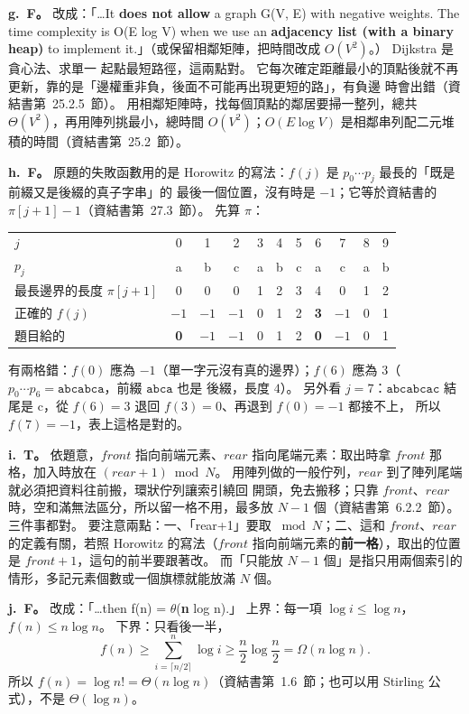 \begin{pastsoln}
\textbf{g.~F。} 改成：「\ldots It \textbf{does not allow} a graph G(V, E) with negative weights. The time complexity is O(E log V) when we use an
\textbf{adjacency list (with a binary heap)} to implement it.」（或保留相鄰矩陣，把時間改成 $O(V^2)$。） Dijkstra 是貪心法、求單一
起點最短路徑，這兩點對。 它每次確定距離最小的頂點後就不再更新，靠的是「邊權重非負，後面不可能再出現更短的路」，有負邊
時會出錯（資結書第~25.2.5~節）。 用相鄰矩陣時，找每個頂點的鄰居要掃一整列，總共 $\Theta(V^2)$，再用陣列挑最小，總時間
$O(V^2)$；$O(E \log V)$ 是相鄰串列配二元堆積的時間（資結書第~25.2~節）。

\textbf{h.~F。} 原題的失敗函數用的是 Horowitz 的寫法：$f(j)$ 是 $p_0 \cdots p_j$ 最長的「既是前綴又是後綴的真子字串」的
最後一個位置，沒有時是 $-1$；它等於資結書的 $\pi[j+1] - 1$（資結書第~27.3~節）。 先算 $\pi$：
\begin{center}
\small
\begin{tabular}{l*{10}{c}}
\toprule
$j$ & 0 & 1 & 2 & 3 & 4 & 5 & 6 & 7 & 8 & 9 \\
$p_j$ & a & b & c & a & b & c & a & c & a & b \\
\midrule
最長邊界的長度 $\pi[j+1]$ & 0 & 0 & 0 & 1 & 2 & 3 & 4 & 0 & 1 & 2 \\
正確的 $f(j)$ & $-1$ & $-1$ & $-1$ & 0 & 1 & 2 & \textbf{3} & $-1$ & 0 & 1 \\
題目給的 & \textbf{0} & $-1$ & $-1$ & 0 & 1 & 2 & \textbf{0} & $-1$ & 0 & 1 \\
\bottomrule
\end{tabular}
\end{center}
有兩格錯：$f(0)$ 應為 $-1$（單一字元沒有真的邊界）；$f(6)$ 應為 $3$（$p_0 \cdots p_6 = \mathtt{abcabca}$，前綴 $\mathtt{abca}$ 也是
後綴，長度 $4$）。 另外看 $j = 7$：$\mathtt{abcabcac}$ 結尾是 c，從 $f(6) = 3$ 退回 $f(3) = 0$、再退到 $f(0) = -1$ 都接不上，
所以 $f(7) = -1$，表上這格是對的。

\textbf{i.~T。} 依題意，$\mathit{front}$ 指向前端元素、$\mathit{rear}$ 指向尾端元素：取出時拿 $\mathit{front}$ 那格，加入時放在
$(\mathit{rear} + 1) \bmod N$。 用陣列做的一般佇列，$\mathit{rear}$ 到了陣列尾端就必須把資料往前搬，環狀佇列讓索引繞回
開頭，免去搬移；只靠 $\mathit{front}$、$\mathit{rear}$ 時，空和滿無法區分，所以留一格不用，最多放 $N - 1$ 個（資結書第~6.2.2~節）。
三件事都對。 要注意兩點：一、「rear+1」要取 $\bmod N$；二、這和 $\mathit{front}$、$\mathit{rear}$ 的定義有關，若照 Horowitz
的寫法（$\mathit{front}$ 指向前端元素的\textbf{前一格}），取出的位置是 $\mathit{front} + 1$，這句的前半要跟著改。 而「只能放
$N - 1$ 個」是指只用兩個索引的情形，多記元素個數或一個旗標就能放滿 $N$ 個。

\textbf{j.~F。} 改成：「\ldots then f(n) = $\theta$(\textbf{n} log n).」 上界：每一項 $\log i \le \log n$，$f(n) \le n \log n$。 下界：只看後一半，
\[
f(n) \ge \sum_{i = \lceil n/2 \rceil}^{n} \log i \ge \frac{n}{2} \log \frac{n}{2} = \Omega(n \log n).
\]
所以 $f(n) = \log n! = \Theta(n \log n)$（資結書第~1.6~節；也可以用 Stirling 公式），不是 $\Theta(\log n)$。
\end{pastsoln}
